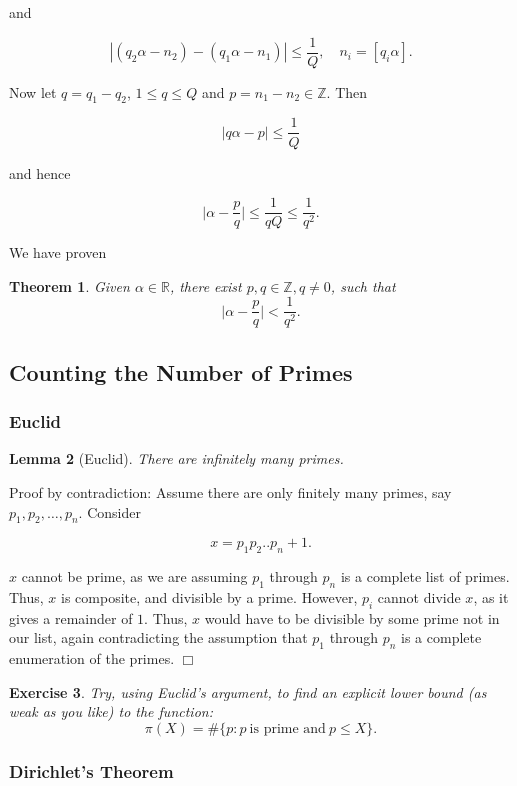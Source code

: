 \documentclass[12pt,letterpaper]{report}
\newcommand\be{\begin{equation}}
\newcommand\ee{\end{equation}}
\newcommand{\R}{\ensuremath{\mathbb{R}}}
\newcommand{\Z}{\ensuremath{\mathbb{Z}}}
\newtheorem{thm}{Theorem}[section]
\newtheorem{lem}[thm]{Lemma}
\newtheorem{exe}[thm]{Exercise}
\begin{document}
and

\be |(q_2\alpha -n_2)-(q_1\alpha -n_1)|\leq \frac{1}{Q},\quad
n_i=[q_i\alpha].\ee

Now let $q=q_1-q_2$, $1\leq q\leq Q$ and $p=n_1-n_2\in \Z$. Then


\be \Big|q\alpha -p\Big|\leq \frac{1}{Q}\ee

and hence

\be \Big|\alpha-\frac{p}{q}\Big|\leq \frac{1}{qQ}\le
\frac{1}{q^2}.\ee

We have proven

\begin{thm}
Given $\alpha \in \R$, there exist $p,q\in\Z, q\neq 0$, such that
\be \Big|\alpha-\frac{p}{q}\Big|<\frac{1}{q^2}.\ee
\end{thm}

\subsection{Counting the Number of Primes}

\subsubsection{Euclid}

\begin{lem}[Euclid]
There are infinitely many primes.
\end{lem}

Proof by contradiction: Assume there are only finitely many
primes, say $p_1,p_2,\dots,p_n$. Consider

\be x = p_1p_2..p_n + 1. \ee

$x$ cannot be prime, as we are assuming $p_1$ through $p_n$ is a
complete list of primes. Thus, $x$ is composite, and divisible by
a prime. However, $p_i$ cannot divide $x$, as it gives a remainder
of $1$. Thus, $x$ would have to be divisible by some prime not in
our list, again contradicting the assumption that $p_1$ through
$p_n$ is a complete enumeration of the primes. $\Box$

\begin{exe}\label{pi} Try, using Euclid's argument, to find an explicit lower
bound (as weak as you like) to the function: \be \pi(X) = \#\{p: p
\ \mbox{is prime and} \ p \le X \}. \ee
\end{exe}



\subsubsection{Dirichlet's Theorem}
\end{document}
